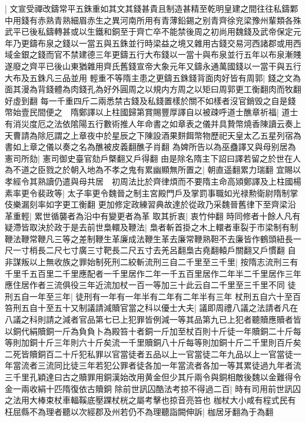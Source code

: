 |{
	文宣受禪改鑄常平五銖重如其文其錢甚貴且制造甚精至乾明皇建之間往往私鑄鄴中用錢有赤熟青熟細眉赤生之異河南所用有青薄鉛錫之别青齊徐兖梁豫州輩類各殊武平已後私鑄轉甚或以生鐵和銅至于齊亡卒不能禁後周之初尚用魏錢及武帝保定元年乃更鑄布泉之錢以一當五與五銖並行時梁益之境又雜用古錢交易河西諸郡或用西域金銀之錢而官不禁建德三年更鑄五行大布錢以一當十與布泉並行五年以布泉漸賤遂廢之齊平已後山東猶雜用齊氏舊錢宣帝大象元年又鑄永通萬國錢以一當干與五行大布及五銖凡三品並用}
輕重不等隋主患之更鑄五銖錢背面肉好皆有周郭|{
	錢之文為面其漫為背錢體為肉錢孔為好外圓周之以規内方周之以矩曰周郭更工衡翻肉而牧翻好虛到翻}
每一千重四斤二兩悉禁古錢及私錢置樣於關不如樣者沒官銷毁之自是錢幣始壹民間便之　隋鄭譯以上柱國歸第賞賜豐厚譯自以被疎呼道士醮章祈福|{
	道士有消災度厄之法依隂陽五行數術推人年命書之如章表之儀并具贄幣燒香陳讀云奏上天曹請為除厄謂之上章夜中於星辰之下陳設酒果䴵餌幣物歷祀天皇太乙五星列宿為書如上章之儀以奏之名為醮被皮義翻醮子肖翻}
為婢所告以為巫蠱譯又與母别居為憲司所劾|{
	憲司御史臺官劾戶槩翻又戶得翻}
由是除名隋主下詔曰譯若留之於世在人為不道之臣戮之於朝入地為不孝之鬼有累幽顯無所置之|{
	朝直遥翻累力瑞翻}
宜賜以孝經令其熟讀仍遣與母共居　初周法比於齊律煩而不要隋主命高熲鄭譯及上柱國楊素率更令裴政等|{
	太子率更令魏晉之制主宮殿門戶及掌罰事職如光禄勲衛尉隋制掌伎樂漏刻率如字更工衡翻}
更加修定政練習典故達於從政乃采魏晉舊律下至齊梁沿革重輕|{
	累世循襲者為沿中有變更者為革}
取其折衷|{
	衷竹仲翻}
時同修者十餘人凡有疑滯皆取決於政于是去前世梟轘及鞭法|{
	梟者斬首掛之木上轘者車裂于市梁制有制鞭法鞭常鞭凡三等之差制鞭生革廉成法鞭生革去廉常鞭熟靼不去廉皆作鶴頭紐長一尺一寸梢長二尺七寸廣三寸靶長二尺五寸去羌呂翻梟古堯翻轅戶關翻又戶慣翻}
自非謀叛以上無收族之罪始制死刑二絞斬流刑三自二千里至三千里|{
	按隋志流刑三有千里千五百里二千里應配者一千里居作二年一千五百里居作二年半二千里居作三年應住居作者三流俱役三年近流加杖一百一等加三十此云自二千里至三千里不同}
徒刑五自一年至三年|{
	徒刑有一年有一年半有二年有二年半有三年}
杖刑五自六十至百笞刑五自十至五十又制議請減贖官當之科以優士大夫|{
	議即周禮八議之法請者凡在八議之科則請之減者官品第七已上犯罪皆例減一等其品第九已上犯者聽贖應贖者皆以銅代絹贖銅一斤為負負卜為殿笞十者銅一斤加至杖百則十斤徒一年贖銅二十斤每等則加銅十斤三年則六十斤矣流一千里贖銅八十斤每等則加銅十斤二千里則百斤矣二死皆贖銅百二十斤犯私罪以官當徒者五品以上一官當徒二年九品以上一官當徒一年當流者三流同比徒三年若犯公罪者徒各加一年當流者各加一等其累徒過九年者流三千里孔穎達曰古之贖罪用銅漢始改用黄金但少其斤兩令與銅相敵後魏以金難得令金一兩收絹十匹隋復依古贖銅}
除前世訊囚酷法考掠不得過二百|{
	時有司用前世訊囚之法用大棒束杖車輻鞵底壓踝杖桄之屬考擊也掠音亮笞也}
枷杖大小咸有程式民有枉屈縣不為理者聽以次經郡及州若仍不為理聽詣闕伸訴|{
	枷居牙翻為于為翻}
